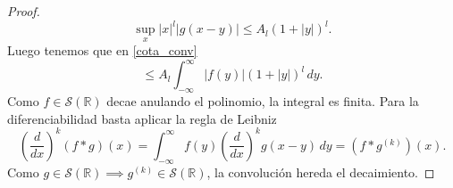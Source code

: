 \documentclass[12pt]{article}
\newcommand{\Sc}{\mathcal{S}(\mathbb{R})}
\theoremstyle{plain}
\theoremstyle{definition}
\numberwithin{equation}{section}
\begin{document}
\begin{proof}
                \begin{equation*}
                    \sup_x \left\lvert x \right\rvert^l \left\lvert g(x-y) \right\rvert \le A_l (1 + \left\lvert y \right\rvert)^l.
                \end{equation*}
                Luego tenemos que en \eqref{cota_conv}
                \begin{equation*}
                    \le A_l \int_{-\infty}^{\infty} \left\lvert f(y) \right\rvert (1 + \left\lvert y \right\rvert)^l \,dy.
                \end{equation*}
                Como \(f \in \Sc\) decae anulando el polinomio, la integral es finita.
                Para la diferenciabilidad basta aplicar la regla de Leibniz
                \begin{equation*}
                    \left(\frac{d}{dx}\right)^k (f * g)(x) = \int_{-\infty}^{\infty} f(y) \left(\frac{d}{dx}\right)^k g(x-y) \,dy = (f * g^{(k)})(x).
                \end{equation*}
                Como \(g \in \Sc \implies g^{(k)} \in \Sc\), la convolución hereda el decaimiento.


\end{proof}
\end{document}
